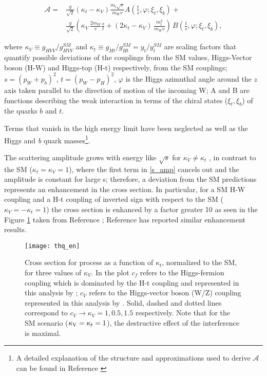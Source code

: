 \begin{equation} \label{s_amp}
\begin{split}
\mathcal{A}= &\frac{g}{\sqrt{2}}(\kappa_t-\kappa_V)\frac{m_t\sqrt{s}}{m_Wv} A\left(\frac{t}{s},\varphi; \xi_{t},\xi_{b}\right) +\\ & \frac{g}{\sqrt{2}} \left(\kappa_V\,\frac{2m_W}{v}\frac{s}{t}+(2\kappa_t-\kappa_V)\,\frac{m_t^{2}}{m_Wv}\right)\,B\left(\frac{t}{s},\varphi; \xi_{t},\xi_{b}\right),
\end{split}
\end{equation}

\noindent where $\kappa_V\equiv g_{HVV}/g_{HVV}^{SM}$ and $\kappa_t\equiv g_{Ht}/g_{Ht}^{SM}=y_t/y_t^{SM}$ are scaling factors that quantify possible deviations of the couplings from the SM values, Higgs-Vector boson (H-W) and Higgs-top (H-t) respectively, from the SM couplings; ${s=(p_{W}+p_{b})^{2}}$, ${t=(p_{W}-p_{H})^{2}}$, $\varphi$ is the Higgs azimuthal angle around the $z$ axis taken parallel to the direction of motion of the incoming W; A and B are functions describing the weak interaction in terms of the chiral states ($\xi_{t},\xi_{b}$) of the quarks $b$ and $t$.

Terms that vanish in the high energy limit have been neglected as well as the Higgs and \textit{b} quark masses\footnote{A detailed explanation of the structure and approximations used to derive $\mathcal{A}$ can be found in Reference \cite{farina}}.

The scattering amplitude grows with energy like $\sqrt{s}$ for $\kappa_V \neq \kappa_t$ , in contrast to the SM ($\kappa_t=\kappa_V=1$), where the first term in \ref{s_amp} cancels out and the amplitude is constant for large s; therefore, a deviation from the SM predictions represents an enhancement in the \tHq cross section. In particular, for a SM H-W coupling and a H-t coupling of inverted sign with respect to the SM ($\kappa_V =-\kappa_t=1$) the \tHq cross section is enhanced by a factor greater 10 as seen in the Figure \ref{thq_en} taken from Reference \cite{farina}; Reference \cite{biswas2} has reported similar enhancement results.

\begin{figure}[h!]
\centering
\texttt{[image: thq\_en]}
\caption[Cross section for \tHq process as a function of $\kappa_t$]{Cross section for \tHq process as a function of $\kappa_t$, normalized to the SM, for three values of $\kappa_V$. In the plot $c_f$ refers to the Higgs-fermion coupling which is dominated by the H-t coupling and represented in this analysis by \Ct; $c_{V}$ refers to the Higgs-vector boson (W/Z) coupling represented in this analysis by \CV. Solid, dashed and dotted lines correspond to $c_V \to \kappa_V= 1, 0.5, 1.5$ respectively. Note that for the SM scenario (${\kappa_\text{V}=\kappa_t=1}$), the destructive effect of the interference is maximal.} 
\label{thq_en}
\end{figure}

